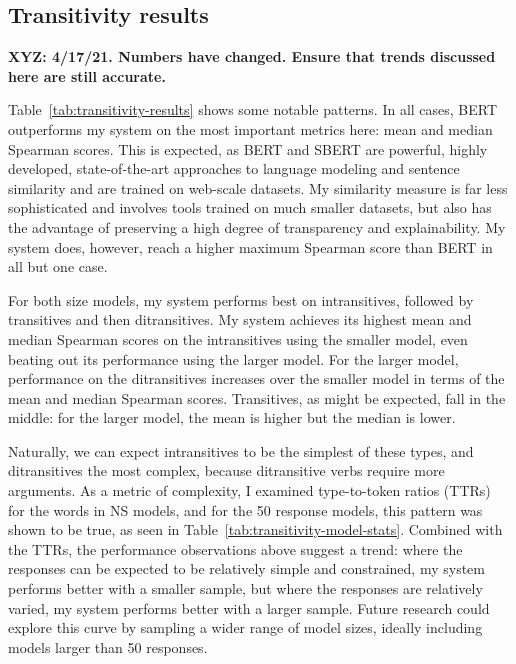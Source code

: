 \subsection{Transitivity results}
\label{sec:transitivity-results}

\bigskip

\textbf{XYZ: 4/17/21. Numbers have changed. Ensure that trends discussed here are still accurate.}

\bigskip

Table~\ref{tab:transitivity-results} shows some notable patterns. In all cases, BERT outperforms my system on the most important metrics here: mean and median Spearman scores. This is expected, as BERT and SBERT are powerful, highly developed, state-of-the-art approaches to language modeling and sentence similarity and are trained on web-scale datasets. My similarity measure is far less sophisticated and involves tools trained on much smaller datasets, but also has the advantage of preserving a high degree of transparency and explainability. My system does, however, reach a higher maximum Spearman score than BERT in all but one case.

For both size models, my system performs best on intransitives, followed by transitives and then ditransitives. My system achieves its highest mean and median Spearman scores on the intransitives using the smaller model, even beating out its performance using the larger model. For the larger model, performance on the ditransitives increases over the smaller model in terms of the mean and median Spearman scores. Transitives, as might be expected, fall in the middle: for the larger model, the mean is higher but the median is lower.

Naturally, we can expect intransitives to be the simplest of these types, and ditransitives the most complex, because ditransitive verbs require more arguments. As a metric of complexity, I examined type-to-token ratios (TTRs) for the words in NS models, and for the 50 response models, this pattern was shown to be true, as seen in Table~\ref{tab:transitivity-model-stats}. Combined with the TTRs, the performance observations above suggest a trend: where the responses can be expected to be relatively simple and constrained, my system performs better with a smaller sample, but where the responses are relatively varied, my system performs better with a larger sample. Future research could explore this curve by sampling a wider range of model sizes, ideally including models larger than 50 responses.

